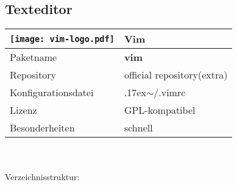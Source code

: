 \subsection{Texteditor}
\begin{tabular}{l|l}
\texttt{[image: vim-logo.pdf]} & Vim \\ \hline
Paketname & \textbf{vim} \\ 
Repository & official repository(extra) \\
Konfigurationsdatei & {{\raise.17ex\hbox{$\scriptstyle\mathtt{\sim}$}}/.vimrc} \\
Lizenz & GPL-kompatibel \\
Besonderheiten & schnell \\
\end{tabular}
\\ \\
Verzeichnisstruktur:  

